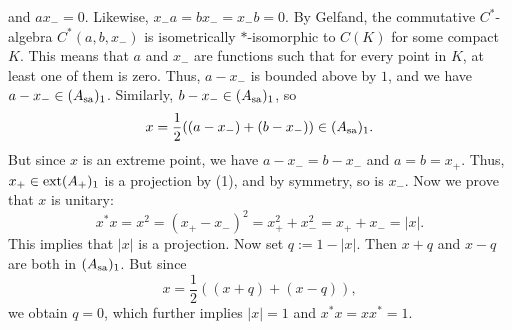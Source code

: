 \begin{myproof}
\begin{enumerate}
    and $a x_- = 0$. Likewise, $x_- a = b x_- = x_- b = 0$. By Gelfand, the commutative $C^*$-algebra $C^*(a, b, x_-)$
    is isometrically $*$-isomorphic to $C(K)$ for some compact $K$. This means that $a$ and $x_-$ are functions such that for every point in $K$,
    at least one of them is zero. Thus, $a - x_-$ is bounded above by $1$, and we have $a - x_- \in (A_{\operatorname{sa}})_1$.
    Similarly, $b - x_- \in (A_{\operatorname{sa}})_1$, so $$x = \frac{1}{2}((a - x_-) + (b - x_-)) \in (A_{\operatorname{sa}})_1.$$
    But since $x$ is an extreme point, we have $a - x_- = b - x_-$ and $a = b = x_+$.
    Thus, $x_+ \in \operatorname{ext} (A_+)_1$ is a projection by (1), and by symmetry, so is $x_-$. Now we prove that $x$ is unitary:
    $$x^* x = x^2 = (x_+ - x_-)^2 = x_+ ^2 + x_- ^2 = x_+ + x_- = |x|.$$
    This implies that $|x|$ is a projection. Now set $q := 1 - |x|$.
    Then $x + q$ and $x - q$ are both in $(A_{\operatorname{sa}})_1$. But since
    $$x = \frac{1}{2} ((x + q) + (x - q)),$$
    we obtain $q = 0$, which further implies $|x| = 1$ and $x^* x = x x^* = 1$. \qedhere
  \end{enumerate}
\end{myproof}